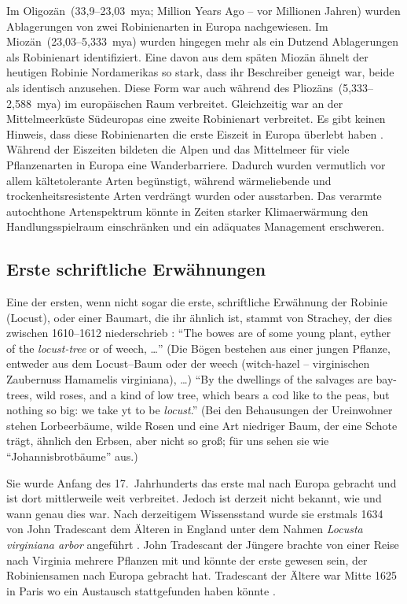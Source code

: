 \documentclass[twocolumn]{scrartcl}
\begin{document}
Im Oligozän~(33,9--23,03~mya; Million Years Ago -- vor
Millionen Jahren) wurden Ablagerungen von zwei Robinienarten in
Europa nachgewiesen. Im Miozän~(23,03--5,333~mya) wurden hingegen mehr
als ein Dutzend Ablagerungen als Robinienart identifiziert. Eine davon
aus dem späten Miozän ähnelt der heutigen Robinie Nordamerikas so
stark, dass ihr Beschreiber geneigt war, beide als identisch
anzusehen. Diese Form war auch während des Pliozäns~(5,333--2,588~mya)
im europäischen Raum verbreitet. Gleichzeitig war an der
Mittelmeerküste Südeuropas eine zweite Robinienart verbreitet. Es gibt
keinen Hinweis, dass diese Robinienarten die erste Eiszeit in Europa
überlebt haben \citep{berry1918robinie}. Während der Eiszeiten
bildeten die Alpen und das Mittelmeer für viele Pflanzenarten in
Europa eine Wanderbarriere. Dadurch wurden vermutlich vor allem
kältetolerante Arten begünstigt, während wärmeliebende und
trockenheitsresistente Arten verdrängt wurden oder ausstarben. Das
verarmte autochthone Artenspektrum könnte in Zeiten starker
Klimaerwärmung den Handlungsspielraum einschränken und ein adäquates
Management erschweren.

\subsection{Erste schriftliche Erwähnungen}

Eine der ersten, wenn nicht sogar die erste, schriftliche Erwähnung der Robinie
(Locust), oder einer Baumart, die ihr ähnlich ist, stammt von Strachey, der dies
zwischen 1610--1612 niederschrieb \citep{strachey1610-1612historie}:
\enquote{The bowes are of some young plant, eyther of the \emph{locust-tree} or
of weech, \dots} (Die Bögen bestehen aus einer jungen Pflanze, entweder aus dem
Locust--Baum oder der weech (witch-hazel -- virginischen Zaubernuss Hamamelis
virginiana), \dots) \enquote{By the dwellings of the salvages are bay-trees,
wild roses, and a kind of low tree, which bears a cod like to the peas, but
nothing so big: we take yt to be \emph{locust}.} (Bei den Behausungen der
Ureinwohner stehen Lorbeerbäume, wilde Rosen und eine Art niedriger Baum, der
eine Schote trägt, ähnlich den Erbsen, aber nicht so groß; für uns sehen sie wie
\enquote{Johannisbrotbäume} aus.)

Sie wurde Anfang des 17.~Jahrhunderts das erste mal nach Europa gebracht und ist
dort mittlerweile weit verbreitet. Jedoch ist derzeit nicht bekannt, wie und
wann genau dies war. Nach derzeitigem Wissensstand wurde sie erstmals 1634 von
John Tradescant dem Älteren in England unter dem Nahmen \emph{Locusta virginiana
arbor} angeführt \citep[S.~339]{gunther1922botanists}. John Tradescant der
Jüngere brachte von einer Reise nach Virginia mehrere Pflanzen mit und könnte
der erste gewesen sein, der Robiniensamen nach Europa gebracht hat. Tradescant
der Ältere war Mitte 1625 in Paris wo ein Austausch stattgefunden haben
könnte \citep{ginter2022robinieGeschichte}.
\end{document}
